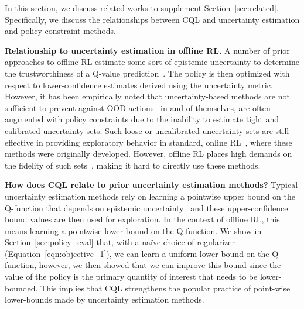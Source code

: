In this section, we discuss related works to supplement Section~\ref{sec:related}. Specifically, we discuss the relationships between CQL and uncertainty estimation and policy-constraint methods.





\textbf{Relationship to uncertainty estimation in offline RL.} 
A number of prior approaches to offline RL estimate some sort of epistemic uncertainty to determine the trustworthiness of a Q-value prediction~\citep{kumar2019stabilizing,fujimoto2018off,agarwal2019optimistic,levine2020offline}.
The policy is then optimized with respect to lower-confidence estimates derived using the uncertainty metric. However, it has been empirically noted that uncertainty-based methods are not sufficient to prevent against OOD actions~\citep{fujimoto2018off,kumar2019stabilizing} in and of themselves, are often augmented with policy constraints due to the inability to estimate tight and calibrated uncertainty sets. Such loose or uncalibrated uncertainty sets are still effective in providing exploratory behavior in standard, online RL~\citep{osband2016deep,osband2017posterior}, where these methods were originally developed. However, offline RL places high demands on the fidelity of such sets~\citep{levine2020offline}, making it hard to directly use these methods.

\textbf{How does CQL relate to prior uncertainty estimation methods?} Typical uncertainty estimation methods rely on learning a pointwise upper bound on the Q-function that depends on epistemic uncertainty~\citep{jaksch2010near,osband2017posterior} and these upper-confidence bound values are then used for exploration. In the context of offline RL, this means learning a pointwise lower-bound on the Q-function. We show in Section~\ref{sec:policy_eval} that, with a na\"ive choice of regularizer (Equation~\ref{eqn:objective_1}), we can learn a uniform lower-bound on the Q-function, however, we then showed that we can improve this bound since the value of the policy is the primary quantity of interest that needs to be lower-bounded. This implies that CQL strengthens the popular practice of point-wise lower-bounds made by uncertainty estimation methods.

